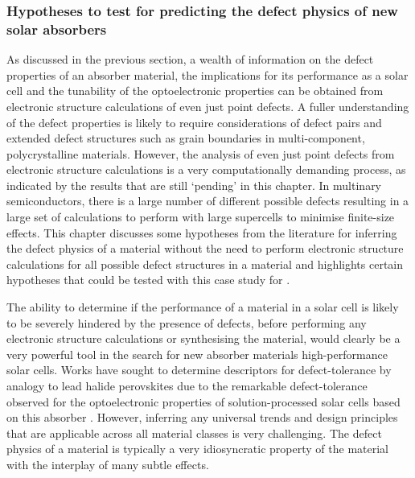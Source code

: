 \documentclass[11pt, twoside]{report}
\begin{document}
\subsubsection{Hypotheses to test for predicting the defect physics of new solar absorbers}
As discussed in the previous section, a wealth of information on the defect properties of an absorber material, the implications for its performance as a solar cell and the tunability of the optoelectronic properties can be obtained from electronic structure calculations of even just point defects. A fuller understanding of the defect properties is likely to require considerations of defect pairs and extended defect structures such as grain boundaries in multi-component, polycrystalline materials.
However, the analysis of even just point defects from electronic structure calculations is a very computationally demanding process, as indicated by the results that are still `pending' in this chapter. In multinary semiconductors, there is a large number of different possible defects resulting in a large set of calculations to perform with large supercells to minimise finite-size effects. This chapter discusses some hypotheses from the literature for inferring the defect physics of a material without the need to perform electronic structure calculations for all possible defect structures in a material and highlights certain hypotheses that could be tested with this case study for {\enargite}.

The ability to determine if the performance of a material in a solar cell is likely to be severely hindered by the presence of defects, before performing any electronic structure calculations or synthesising the material, would clearly be a very powerful tool in the search for new absorber materials high-performance solar cells. Works have sought to determine descriptors for defect-tolerance by analogy to lead halide perovskites \cite{MIT_defect_tolerance} due to the remarkable defect-tolerance observed for the optoelectronic properties of solution-processed solar cells based on this absorber \cite{MAPI_defect_tolerance_Berry, MAPI_defect_phys}. However, inferring any universal trends and design principles that are applicable across all material classes is very challenging. The defect physics of a material is typically a very idiosyncratic property of the material with the interplay of many subtle effects.
\end{document}
